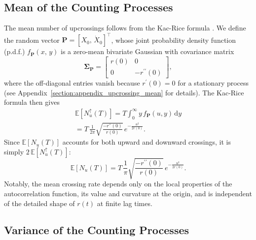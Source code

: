 \documentclass[journal]{IEEEtran}
\theoremstyle{plain}
\theoremstyle{definition}
\theoremstyle{remark}
\newcommand{\E}{\mathbb{E}}
\newcommand{\Nu}{N_u(T)}
\newcommand{\Nup}{N_u^{\uparrow}(T)}
\newcommand{\dd}{\mathrm{d}}
\newcommand{\rpp}{r^{\prime\prime}}
\begin{document}
\subsection{Mean of the Counting Processes}

The mean number of upcrossings follows from the Kac-Rice formula \cite{kac1943, rice1944mathematical}. We define the random vector $\mathbf{P} = [X_{0}, \, \dot{X}_{0}]^\top$, whose joint probability density function (p.d.f.) $f_{\mathbf{P}}(x,\,y)$ is a zero-mean bivariate Gaussian with covariance matrix
\begin{equation}
\renewcommand{\arraystretch}{1.5}
    \boldsymbol{\Sigma}_{\mathbf{P}} = \begin{bmatrix}
                r(0) & 0 \\
                0 & -\rpp(0)
                \end{bmatrix}, \label{eq:correlation_mat_P_main}
\end{equation}
where the off-diagonal entries vanish because $r^\prime(0)=0$ for a stationary process (see Appendix~\ref{section:appendix_upcrossing_mean} for details). The Kac-Rice formula then gives \cite{rice1944mathematical}
\begin{multline}
    \E\left[\Nup\right] = T \int_{0}^\infty y\, f_{\mathbf{P}}(u,y) \, \dd y \\
    = T \, \frac{1}{2\pi}\sqrt{\frac{-r^{\prime\prime}(0)}{r(0)}} \, e^{-\frac{u^2}{2r(0)}}. \label{eq:rice_formula_specific_main}
\end{multline}
Since $\E\left[\Nu\right]$ accounts for both upward and downward crossings, it is simply $2\, \E[\Nup]$:
\begin{equation}
    \E\left[\Nu\right] = T\, \frac{1}{\pi}\sqrt{\frac{-r^{\prime\prime}(0)}{r(0)}} \, e^{-\frac{u^2}{2r(0)}}.
\end{equation}
Notably, the mean crossing rate depends only on the local properties of the autocorrelation function, its value and curvature at the origin, and is independent of the detailed shape of $r(t)$ at finite lag times.


\subsection{Variance of the Counting Processes} \label{section:variance_derivation}
\end{document}
